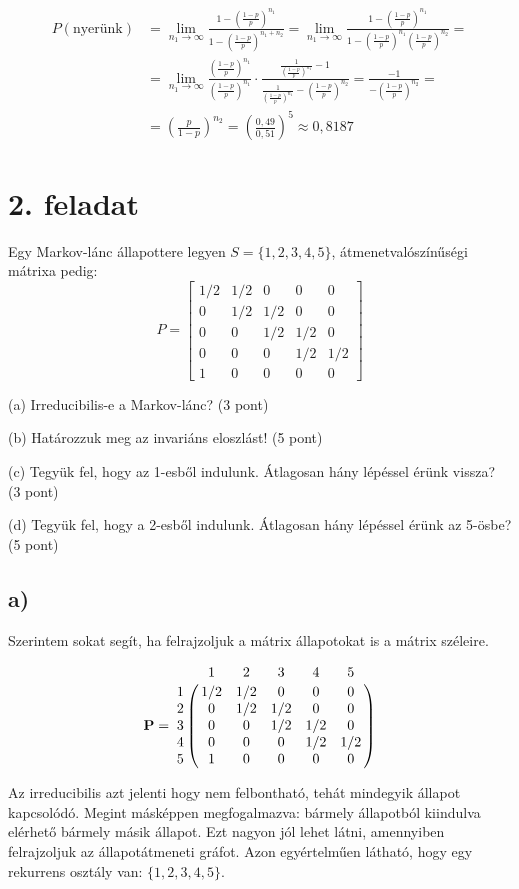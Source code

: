 \documentclass[a4paper,12pt]{article}   		%
\begin{document}
\[
\begin{split}
P(\text{nyerünk}) &= 
\lim_{n_1 \to \infty} \frac{1-\left(\frac{1-p}{p}\right)^{n_1}}
{1-\left(\frac{1-p}{p}\right)^{n_1+n_2}} =
\lim_{n_1 \to \infty} \frac{1-\left(\frac{1-p}{p}\right)^{n_1}}
{1-\left(\frac{1-p}{p}\right)^{n_1}\left(\frac{1-p}{p}\right)^{n_2}} =\\
&= \lim_{n_1 \to \infty} \frac{\left(\frac{1-p}{p}\right)^{n_1}}
{\left(\frac{1-p}{p}\right)^{n_1}} \cdot 
\frac{\frac{1}{\left(\frac{1-p}{p}\right)^{n_1}}-1}
{\frac{1}{\left(\frac{1-p}{p}\right)^{n_1}} -
\left(\frac{1-p}{p}\right)^{n_2}} 
= \frac{-1}{-\left(\frac{1-p}{p}\right)^{n_2}} =\\
&= \left(\frac{p}{1-p}\right)^{n_2} = 
\left(\frac{0,49}{0,51}\right)^{5} \approx 0,8187
\end{split}
\]
\section*{2. feladat}
Egy Markov-lánc állapottere legyen $S=\{1,2,3,4,5\}$, átmenetvalószínűségi
mátrixa pedig:
\[
P = 
\begin{bmatrix}
1/2	&	1/2	&	0	&	0	&	0	\\
0	&	1/2	&	1/2	&	0	&	0	\\
0	&	0	&	1/2	&	1/2	&	0	\\
0	&	0	&	0	&	1/2	&	1/2	\\
1	&	0	&	0	&	0	&	0
\end{bmatrix}
\]

(a) Irreducibilis-e a Markov-lánc? (3 pont)

(b) Határozzuk meg az invariáns eloszlást! (5 pont)

(c) Tegyük fel, hogy az 1-esből indulunk. Átlagosan hány lépéssel érünk
vissza? (3 pont)

(d) Tegyük fel, hogy a 2-esből indulunk. Átlagosan hány lépéssel érünk
az 5-ösbe? (5 pont)

\subsection*{a)}
Szerintem sokat segít, ha felrajzoljuk a mátrix állapotokat is a mátrix
széleire.

\[
\mathbf{P} = 
\bordermatrix{
~	&	1	&	2	&	3	&	4	&	5	\cr
1	&	1/2	&	1/2	&	0	&	0	&	0	\cr
2	&	0	&	1/2	&	1/2	&	0	&	0	\cr
3	&	0	&	0	&	1/2	&	1/2	&	0	\cr
4	&	0	&	0	&	0	&	1/2	&	1/2	\cr
5	&	1	&	0	&	0	&	0	&	0}
\]

Az irreducibilis azt jelenti hogy nem felbontható, tehát mindegyik 
állapot kapcsolódó. Megint másképpen megfogalmazva: bármely 
állapotból kiindulva elérhető bármely másik állapot. Ezt nagyon jól
lehet látni, amennyiben felrajzoljuk az állapotátmeneti gráfot.
Azon egyértelműen látható, hogy egy rekurrens osztály van:
$\{1, 2, 3, 4, 5\}$.
\end{document}
